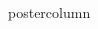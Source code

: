 \documentclass[final]{beamer}
\begin{document}
\begin{frame}{}
\begin{columns}[c]
\begin{column}{.48\textwidth}
\begin{beamercolorbox}[center,wd=\textwidth]{postercolumn}
            \end{beamercolorbox}
        \end{column}
        \begin{column}{.01\textwidth}
        \end{column}
    \end{columns}
\end{frame}
\end{document}
